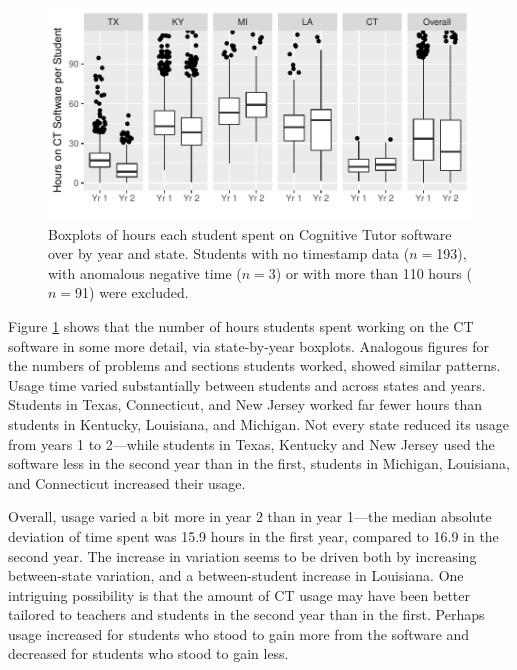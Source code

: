 \documentclass[notitlepage,12pt]{jedm}\usepackage[]{graphicx}\usepackage[]{color}
\makeatletter
\def\maxwidth{ %
  \ifdim\Gin@nat@width>\linewidth
    \linewidth
  \else
    \Gin@nat@width
  \fi
}
\makeatother
\begin{document}
\begin{figure}
\centering

\includegraphics[width=\maxwidth]{figure/usageTime-1} 

\caption{Boxplots of hours each student spent on Cognitive Tutor
  software over by year and state. Students  with no timestamp data
  ($n=$193), with anomalous negative time
  ($n=$3) or with more than 110 hours ($n=$91)
  were excluded.}
\label{fig:timeByStud}
\end{figure}





Figure \ref{fig:timeByStud} shows that the number of hours students
spent working on the CT software in some more detail, via
state-by-year boxplots.
Analogous figures for the numbers of problems and sections students
worked,
showed similar patterns.
Usage time varied substantially between students and across states and
years.
Students in Texas,
Connecticut, and New Jersey worked far fewer hours than students in
Kentucky, Louisiana, and Michigan.
Not every state reduced its usage from years 1 to 2---while students
in Texas, Kentucky and New Jersey used the software less in the second
year than in the first, students in Michigan, Louisiana, and
Connecticut increased their usage.

Overall, usage varied a bit more in year 2 than in year
1---the median absolute deviation of time spent was 15.9 hours in the first year, compared to 16.9 in  the second year.
The increase in variation seems to be driven both by increasing
between-state variation, and a between-student increase in Louisiana.
One intriguing possibility is that the amount of CT usage may have been better tailored to
teachers and students in the second year than in the first. Perhaps
usage increased for
students who stood to gain more from the software and decreased for
students who stood to gain less.
\end{document}
